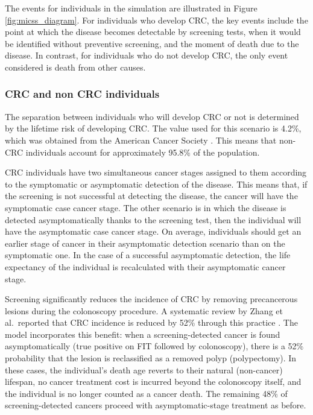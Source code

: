 \documentclass[sn-mathphys-num]{sn-jnl}%
\theoremstyle{thmstyleone}%
\theoremstyle{thmstyletwo}%
\theoremstyle{thmstylethree}%
\begin{document}
The events for individuals in the simulation are illustrated in Figure \ref{fig:micss_diagram}. For individuals who develop CRC, the key events include the point at which the disease becomes detectable by screening tests, when it would be identified without preventive screening, and the moment of death due to the disease. In contrast, for individuals who do not develop CRC, the only event considered is death from other causes.

\subsubsection{CRC and non CRC individuals}
The separation between individuals who will develop CRC or not is determined by the lifetime risk of developing CRC. The value used for this scenario is 4.2\%, which was obtained from the American Cancer Society \cite{noauthor_colorectal_nodate-1}. This means that non-CRC individuals account for approximately 95.8\% of the population.

CRC individuals have two simultaneous cancer stages assigned to them according to the symptomatic or asymptomatic detection of the disease. This means that, if the screening is not successful at detecting the disease, the cancer will have the symptomatic case cancer stage. The other scenario is in which the disease is detected asymptomatically thanks to the screening test, then the individual will have the asymptomatic case cancer stage. On average, individuals should get an earlier stage of cancer in their asymptomatic detection scenario than on the symptomatic one. In the case of a successful asymptomatic detection, the life expectancy of the individual is recalculated with their asymptomatic cancer stage. 

Screening significantly reduces the incidence of CRC by removing precancerous lesions during the colonoscopy procedure. A systematic review by Zhang et al.\ reported that CRC incidence is reduced by 52\% through this practice \cite{zhang_colonoscopic_2020}. The model incorporates this benefit: when a screening-detected cancer is found asymptomatically (true positive on FIT followed by colonoscopy), there is a 52\% probability that the lesion is reclassified as a removed polyp (polypectomy). In these cases, the individual's death age reverts to their natural (non-cancer) lifespan, no cancer treatment cost is incurred beyond the colonoscopy itself, and the individual is no longer counted as a cancer death. The remaining 48\% of screening-detected cancers proceed with asymptomatic-stage treatment as before.
\end{document}
